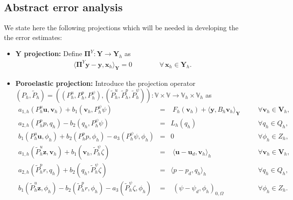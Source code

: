\documentclass[smallextended]{svjour3}
\numberwithin{equation}{section}
\numberwithin{figure}{section}
\numberwithin{table}{section}
\newcommand\bV{\mathbf{V}}
\newcommand\bPi{\boldsymbol{\Pi}}
\newcommand{\tP}{\tilde{P}}
\newcommand\bx{\boldsymbol{x}}
\newcommand\by{\boldsymbol{y}}
\newcommand\bu{\boldsymbol{u}}
\newcommand\bv{\boldsymbol{v}}
\newcommand\bz{\boldsymbol{z}}
\newcommand{\bY}{\boldsymbol{Y}}
\newcommand{\bbV}{\mathbb{V}}
\begin{document}
	\subsection{Abstract error analysis}

    We state here the following projections which will be needed in developing the
    the error estimates:
	
	\begin{itemize}
		\item {\bf $\bY$ projection:} Define $\bPi^{Y}: \bY \to \bY_h$ as
		\begin{align} \label{def:Py}
			\langle \bPi^{Y} \by - \by, \bx_h\rangle_{\bY} =0 \qquad \qquad \forall \,\bx_h \in \bY_h.
		\end{align}
		\item {\bf Poroelastic projection:} Introduce the projection operator
		$(P_h, \tP_h)=((P_h^u, P_h^p, P_h^{\psi}), (\tP_h^u,  \tP_h^p,  \tP_h^{\psi})): \bbV \times \bbV \to \bbV_h \times \bbV_h$
		 as
		\begin{subequations}\label{eq:Poro-proj}
			\begin{alignat}{6}
				a_{1,h}(P_h^u \bu, \bv_h) +  b_1(\bv_h, P_h^{\psi} \psi)     &=&\;F_h(\bv_h) + \langle \by, B_h \bv_h \rangle_{\bY}    &\quad&\forall \bv_h \in \bV_h, \label{eq:Poro-proj-a}\\
				a_{2,h}(P_h^p p, q_h) - b_2(q_h, P_h^{\psi} \psi)  &=& L_h(q_h) \qquad \quad   &\quad&\forall q_h \in Q_h, \label{eq:Poro-proj-b} \\
				b_1(P_h^u \bu, \phi_h)  +  b_2(P_h^p p, \phi_h) - a_3(P_h^\psi \psi, \phi_h)  &=&0 \qquad \, \qquad   &\quad&\forall \phi_h \in Z_h, \label{eq:Poro-proj-c} \\
				a_{1,h}(\tP_h^u \bz, \bv_h) + b_1(\bv_h, \tP_h^{\psi} \zeta)     &=&\;\langle \bu - \bu_d, \bv_h \rangle_h  \qquad  &\quad&\forall \bv_h \in \bV_h, \label{eq:Poro-proj-d}\\
				a_{2,h}(\tP_h^p r, q_h) + b_2(q_h, \tP_h^{\psi} \zeta)  &=& \langle p- p_d, q_h \rangle_h  \qquad  &\quad&\forall q_h \in Q_h, \label{eq:Poro-proj-e} \\
				b_1(\tP_h^u \bz, \phi_h) - b_2(\tP_h^p r, \phi_h) - a_3(\tP_h^\psi \zeta, \phi_h)  &=& \,\,( \psi - \psi_d, \phi_h )_{0, \Omega} \qquad  &\quad&\forall \phi_h \in Z_h. \label{eq:Poro-proj-f}
		\end{alignat}\end{subequations}
	\end{itemize}
\end{document}
